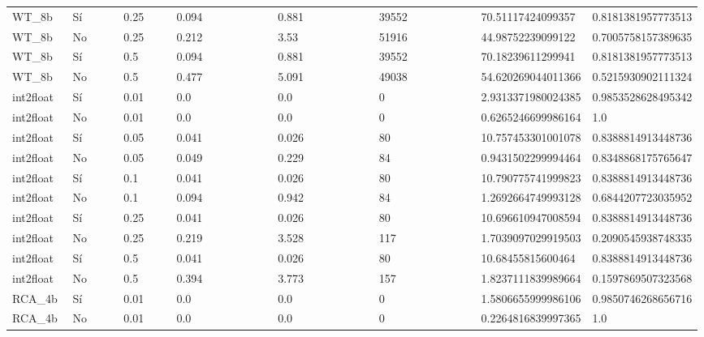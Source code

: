 {{\begin{longtable}{M{0.09\linewidth}M{0.09\linewidth}M{0.09\linewidth}M{0.09\linewidth}M{0.09\linewidth}M{0.09\linewidth}M{0.09\linewidth}M{0.09\linewidth}M{0.09\linewidth}M{0.09\linewidth}M{0.09\linewidth}}
WT\_8b & Sí & \num{0.25} & \num{0.094} &   & \num{0.881} &   & \num{39552} &   & \num{70.51117424099357} & \num{0.8181381957773513} \\
WT\_8b & No & \num{0.25} & \num{0.212} &   & \num{3.53} &   & \num{51916} &   & \num{44.98752239099122} & \num{0.7005758157389635} \\
WT\_8b & Sí & \num{0.5} & \num{0.094} &   & \num{0.881} &   & \num{39552} &   & \num{70.18239611299941} & \num{0.8181381957773513} \\
WT\_8b & No & \num{0.5} & \num{0.477} &   & \num{5.091} &   & \num{49038} &   & \num{54.620269044011366} & \num{0.5215930902111324} \\
int2float & Sí & \num{0.01} & \num{0.0} &   & \num{0.0} &   & \num{0} &   & \num{2.9313371980024385} & \num{0.9853528628495342} \\
int2float & No & \num{0.01} & \num{0.0} &   & \num{0.0} &   & \num{0} &   & \num{0.6265246699986164} & \num{1.0} \\
int2float & Sí & \num{0.05} & \num{0.041} &   & \num{0.026} &   & \num{80} &   & \num{10.757453301001078} & \num{0.8388814913448736} \\
int2float & No & \num{0.05} & \num{0.049} &   & \num{0.229} &   & \num{84} &   & \num{0.9431502299994464} & \num{0.8348868175765647} \\
int2float & Sí & \num{0.1} & \num{0.041} &   & \num{0.026} &   & \num{80} &   & \num{10.790775741999823} & \num{0.8388814913448736} \\
int2float & No & \num{0.1} & \num{0.094} &   & \num{0.942} &   & \num{84} &   & \num{1.2692664749993128} & \num{0.6844207723035952} \\
int2float & Sí & \num{0.25} & \num{0.041} &   & \num{0.026} &   & \num{80} &   & \num{10.696610947008594} & \num{0.8388814913448736} \\
int2float & No & \num{0.25} & \num{0.219} &   & \num{3.528} &   & \num{117} &   & \num{1.7039097029919503} & \num{0.2090545938748335} \\
int2float & Sí & \num{0.5} & \num{0.041} &   & \num{0.026} &   & \num{80} &   & \num{10.68455815600464} & \num{0.8388814913448736} \\
int2float & No & \num{0.5} & \num{0.394} &   & \num{3.773} &   & \num{157} &   & \num{1.8237111839989664} & \num{0.1597869507323568} \\
RCA\_4b & Sí & \num{0.01} & \num{0.0} &   & \num{0.0} &   & \num{0} &   & \num{1.5806655999986106} & \num{0.9850746268656716} \\
RCA\_4b & No & \num{0.01} & \num{0.0} &   & \num{0.0} &   & \num{0} &   & \num{0.2264816839997365} & \num{1.0} \\

\end{longtable}}}
